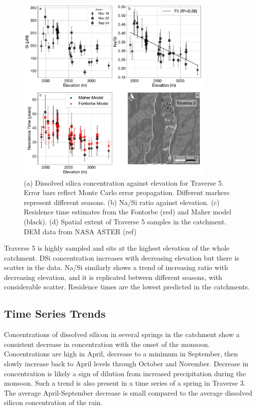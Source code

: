 \begin{figure}[h]
    \centering
        \includegraphics[width=0.85\textwidth]{Traverse_5_summary.pdf}
    \caption{(a) Dissolved silica concentration against elevation for Traverse 5. Error bars reflect Monte Carlo error propagation. Different markers represent different seasons. (b) Na/Si ratio against elevation. (c) Residence time estimates from the Fontorbe (red) and Maher model (black). (d) Spatial extent of Traverse 5 samples in the catchment. DEM data from NASA ASTER (ref)}
    \label{fig:trav5}
\end{figure}

\FloatBarrier

Traverse 5 is highly sampled and sits at the highest elevation of the whole catchment. DSi concentration increases with decreasing elevation but there is scatter in the data. Na/Si similarly shows a trend of increasing ratio with decreasing elevation, and it is replicated between different seasons, with considerable scatter. Residence times are the lowest predicted in the catchments.


\subsection{Time Series Trends}

Concentrations of dissolved silicon in several springs in the catchment show a consistent decrease in concentration with the onset of the monsoon. Concentrations are high in April, decrease to a minimum in September, then slowly increase back to April levels through October and November. Decrease in concentration is likely a sign of dilution from increased precipitation during the monsoon. Such a trend is also present in a time series of a spring in Traverse 3. The average April-September decrease is small compared to the average dissolved silicon concentration of the rain.



